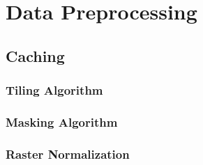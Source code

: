 \section{Data Preprocessing}

\subsection{Caching}

\subsubsection{Tiling Algorithm}


\subsubsection{Masking Algorithm}
\label{sec:masking}


\subsubsection{Raster Normalization}
\label{sec:raster-normalization}

